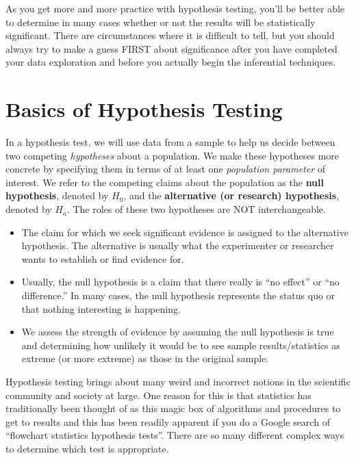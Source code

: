 \documentclass[]{tufte-book}
\providecommand{\tightlist}{%
  \setlength{\itemsep}{0pt}\setlength{\parskip}{0pt}}
\begin{document}
As you get more and more practice with hypothesis testing, you'll be
better able to determine in many cases whether or not the results will
be statistically significant. There are circumstances where it is
difficult to tell, but you should always try to make a guess FIRST about
significance after you have completed your data exploration and before
you actually begin the inferential techniques.

\section{Basics of Hypothesis
Testing}\label{basics-of-hypothesis-testing}

In a hypothesis test, we will use data from a sample to help us decide
between two competing \emph{hypotheses} about a population. We make
these hypotheses more concrete by specifying them in terms of at least
one \emph{population parameter} of interest. We refer to the competing
claims about the population as the \textbf{null hypothesis}, denoted by
\(H_0\), and the \textbf{alternative (or research) hypothesis}, denoted
by \(H_a\). The roles of these two hypotheses are NOT interchangeable.

\begin{itemize}
\tightlist
\item
  The claim for which we seek significant evidence is assigned to the
  alternative hypothesis. The alternative is usually what the
  experimenter or researcher wants to establish or find evidence for.
\item
  Usually, the null hypothesis is a claim that there really is ``no
  effect'' or ``no difference.'' In many cases, the null hypothesis
  represents the status quo or that nothing interesting is happening.\\
\item
  We assess the strength of evidence by assuming the null hypothesis is
  true and determining how unlikely it would be to see sample
  results/statistics as extreme (or more extreme) as those in the
  original sample.
\end{itemize}

Hypothesis testing brings about many weird and incorrect notions in the
scientific community and society at large. One reason for this is that
statistics has traditionally been thought of as this magic box of
algorithms and procedures to get to results and this has been readily
apparent if you do a Google search of ``flowchart statistics hypothesis
tests''. There are so many different complex ways to determine which
test is appropriate.
\end{document}
